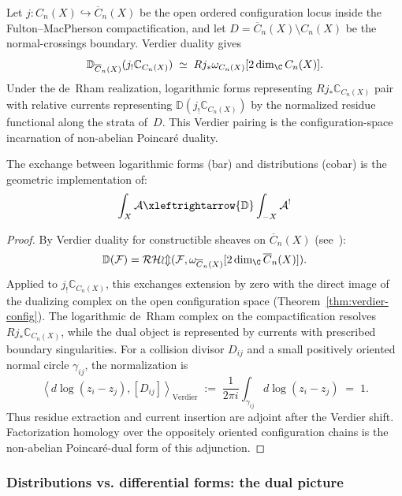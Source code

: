 \begin{theorem}[Verdier duality = NAP duality {\cite{AF15,KS90}}; \ClaimStatusProvedElsewhere]\label{thm:verdier-NAP}
Let $j\colon C_n(X)\hookrightarrow \overline C_n(X)$ be the open
ordered configuration locus inside the Fulton--MacPherson
compactification, and let $D=\overline C_n(X)\setminus C_n(X)$ be
the normal-crossings boundary. Verdier duality gives
\[
\mathbb{D}_{\overline C_n(X)}(j_!\mathbb{C}_{C_n(X)})
\;\simeq\;
Rj_*\omega_{C_n(X)}[2\dim_\C C_n(X)] .
\]
Under the de~Rham realization, logarithmic forms representing
$Rj_*\mathbb C_{C_n(X)}$ pair with relative currents representing
$\mathbb{D}(j_!\mathbb C_{C_n(X)})$ by the normalized residue
functional along the strata of~$D$. This Verdier pairing is the
configuration-space incarnation of non-abelian Poincar\'e duality.

The exchange between logarithmic forms (bar) and distributions (cobar) is the geometric implementation of:
\[\int_X \mathcal{A} \xleftrightarrow{\mathbb{D}} \int_{-X} \mathcal{A}^!\]
\end{theorem}

\begin{proof}
By Verdier duality for constructible sheaves on $\overline{C}_n(X)$ (see~\cite{KS90}):
\[\mathbb{D}(\mathcal{F}) =
\mathcal{RHom}(\mathcal{F}, \omega_{\overline{C}_n(X)}
[2\dim_\C \overline C_n(X)]) .\]
Applied to $j_!\mathbb{C}_{C_n(X)}$, this exchanges extension by
zero with the direct image of the dualizing complex on the open
configuration space (Theorem~\ref{thm:verdier-config}). The
logarithmic de~Rham complex on the compactification resolves
$Rj_*\mathbb C_{C_n(X)}$, while the dual object is represented by
currents with prescribed boundary singularities. For a collision
divisor $D_{ij}$ and a small positively oriented normal circle
$\gamma_{ij}$, the normalization is
\[
\left\langle d\log(z_i-z_j), [D_{ij}]\right\rangle_{\mathrm{Verdier}}
\;:=\;
\frac{1}{2\pi i}\int_{\gamma_{ij}}d\log(z_i-z_j)
\;=\;1 .
\]
Thus residue extraction and current insertion are adjoint after the
Verdier shift. Factorization homology over the oppositely oriented
configuration chains is the non-abelian Poincar\'e-dual form of this
adjunction.
\end{proof}

\subsubsection{Distributions vs. differential forms: the dual picture}

